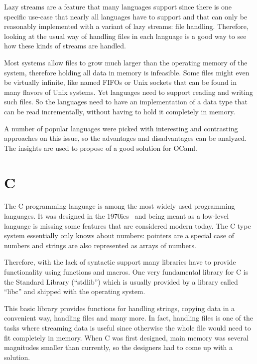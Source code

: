 \documentclass[parskip=half]{scrreprt}
\begin{document}
Lazy streams are a feature that many languages support since there is one
specific use-case that nearly all languages have to support and that can only
be reasonably implemented with a variant of lazy streams: file handling.
Therefore, looking at the usual way of handling files in each language is a
good way to see how these kinds of streams are handled.

Most systems allow files to grow much larger than the operating memory of the
system, therefore holding all data in memory is infeasible. Some files might
even be virtually infinite, like named FIFOs or Unix sockets that can be found
in many flavors of Unix systems. Yet languages need to support reading and
writing such files. So the languages need to have an implementation of a data
type that can be read incrementally, without having to hold it completely in
memory.

A number of popular languages were picked with interesting and contrasting
approaches on this issue, so the advantages and disadvantages can be analyzed.
The insights are used to propose of a good solution for OCaml.

\section{C}
\label{sec:c}

The C programming language is among the most widely used programming languages.
It was designed in the 1970ies~\cite[p.~1]{kernighan1988c} and being meant as a
low-level language is missing some features that are considered modern today.
The C type system essentially only knows about numbers: pointers are a special
case of numbers and strings are also represented as arrays of numbers.

Therefore, with the lack of syntactic support many libraries have to provide
functionality using functions and macros. One very fundamental library for C is
the Standard Library (\enquote{stdlib}) which is usually provided by a library
called \enquote{libc} and shipped with the operating system.

This basic library provides functions for handling strings, copying data in a
convenient way, handling files and many more. In fact, handling files is one of
the tasks where streaming data is useful since otherwise the whole file would
need to fit completely in memory. When C was first designed, main memory was
several magnitudes smaller than currently, so the designers had to come up with
a solution.
\end{document}
